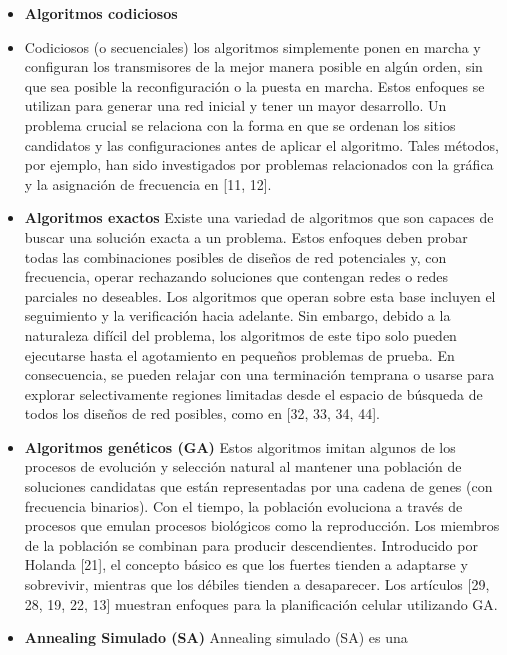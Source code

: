 \documentclass[]{article}
\providecommand{\tightlist}{%
  \setlength{\itemsep}{0pt}\setlength{\parskip}{0pt}}
\begin{document}
\begin{itemize}
\tightlist
\item
  \textbf{Algoritmos codiciosos} 
\end{itemize}

\begin{itemize}
\item
  Codiciosos (o secuenciales) los algoritmos simplemente ponen en marcha
  y configuran los transmisores de la mejor manera posible en algún
  orden, sin que sea posible la reconfiguración o la puesta en marcha.
  Estos enfoques se utilizan para generar una red inicial y tener un
  mayor desarrollo. Un problema crucial se relaciona con la forma en que
  se ordenan los sitios candidatos y las configuraciones antes de
  aplicar el algoritmo. Tales métodos, por ejemplo, han sido
  investigados por problemas relacionados con la gráfica y la asignación
  de frecuencia en {[}11, 12{]}.
\item
  \textbf{Algoritmos exactos} Existe una variedad de algoritmos que son
  capaces de buscar una solución exacta a un problema. Estos enfoques
  deben probar todas las combinaciones posibles de diseños de red
  potenciales y, con frecuencia, operar rechazando soluciones que
  contengan redes o redes parciales no deseables. Los algoritmos que
  operan sobre esta base incluyen el seguimiento y la verificación hacia
  adelante. Sin embargo, debido a la naturaleza difícil del problema,
  los algoritmos de este tipo solo pueden ejecutarse hasta el
  agotamiento en pequeños problemas de prueba. En consecuencia, se
  pueden relajar con una terminación temprana o usarse para explorar
  selectivamente regiones limitadas desde el espacio de búsqueda de
  todos los diseños de red posibles, como en {[}32, 33, 34, 44{]}.
\item
  \textbf{Algoritmos genéticos (GA)} Estos algoritmos imitan algunos de
  los procesos de evolución y selección natural al mantener una
  población de soluciones candidatas que están representadas por una
  cadena de genes (con frecuencia binarios). Con el tiempo, la población
  evoluciona a través de procesos que emulan procesos biológicos como la
  reproducción. Los miembros de la población se combinan para producir
  descendientes. Introducido por Holanda {[}21{]}, el concepto básico es
  que los fuertes tienden a adaptarse y sobrevivir, mientras que los
  débiles tienden a desaparecer. Los artículos {[}29, 28, 19, 22, 13{]}
  muestran enfoques para la planificación celular utilizando GA.
\item
  \textbf{Annealing Simulado (SA)} Annealing simulado (SA) es una

\end{itemize}
\end{document}
